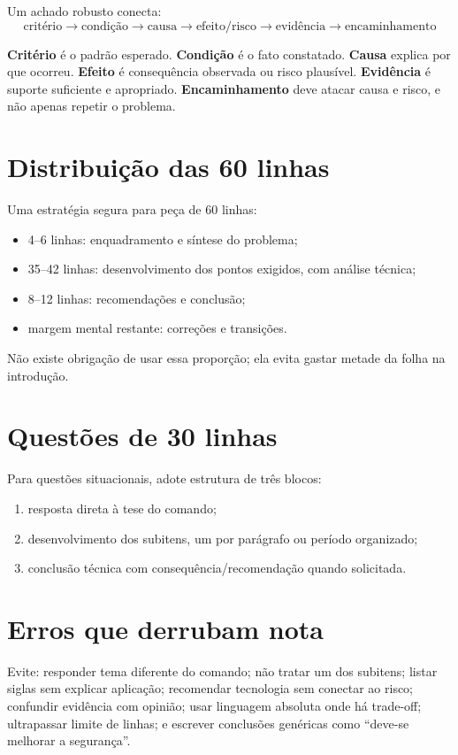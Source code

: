 Um achado robusto conecta:
\[
\text{critério} \rightarrow \text{condição} \rightarrow \text{causa} \rightarrow \text{efeito/risco} \rightarrow \text{evidência} \rightarrow \text{encaminhamento}
\]

\textbf{Critério} é o padrão esperado. \textbf{Condição} é o fato constatado. \textbf{Causa} explica por que ocorreu. \textbf{Efeito} é consequência observada ou risco plausível. \textbf{Evidência} é suporte suficiente e apropriado. \textbf{Encaminhamento} deve atacar causa e risco, e não apenas repetir o problema.

\section{Distribuição das 60 linhas}

Uma estratégia segura para peça de 60 linhas:
\begin{itemize}
\item 4--6 linhas: enquadramento e síntese do problema;
\item 35--42 linhas: desenvolvimento dos pontos exigidos, com análise técnica;
\item 8--12 linhas: recomendações e conclusão;
\item margem mental restante: correções e transições.
\end{itemize}

Não existe obrigação de usar essa proporção; ela evita gastar metade da folha na introdução.

\section{Questões de 30 linhas}

Para questões situacionais, adote estrutura de três blocos:
\begin{enumerate}
\item resposta direta à tese do comando;
\item desenvolvimento dos subitens, um por parágrafo ou período organizado;
\item conclusão técnica com consequência/recomendação quando solicitada.
\end{enumerate}

\section{Erros que derrubam nota}

\begin{atencao}
Evite: responder tema diferente do comando; não tratar um dos subitens; listar siglas sem explicar aplicação; recomendar tecnologia sem conectar ao risco; confundir evidência com opinião; usar linguagem absoluta onde há trade-off; ultrapassar limite de linhas; e escrever conclusões genéricas como ``deve-se melhorar a segurança''.
\end{atencao}

